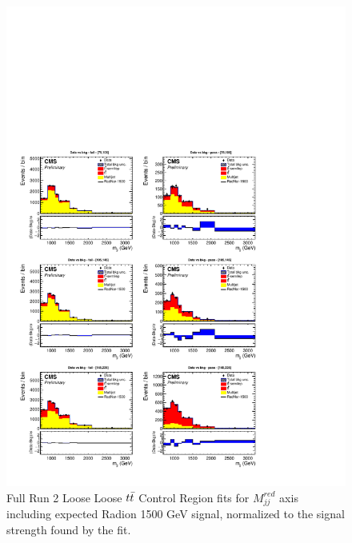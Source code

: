 \begin{figure}[!htb]
	\centering
	\includegraphics[width=1\textwidth]{Figures/postfit_projy_fits_LLtt.pdf}
	\caption{Full Run 2 Loose Loose $t\bar{t} $ Control Region fits for $M_{jj}^{red}$ axis including expected Radion 1500 GeV signal, normalized to the signal strength found by the fit.}
	\label{fig:LLttmjj}
\end{figure}
